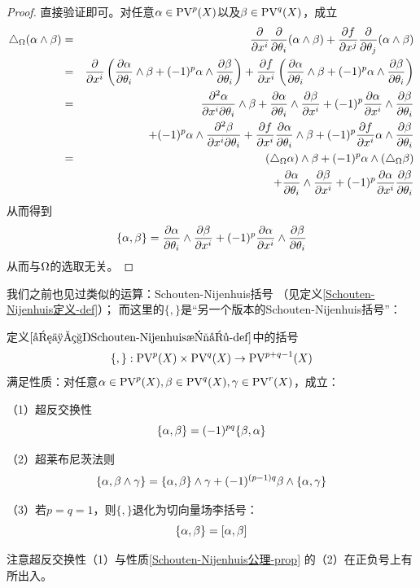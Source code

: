 \begin{proof}
直接验证即可。对任意$\alpha\in\operatorname{PV}^p(X)$以及$\beta\in\operatorname{PV}^q(X)$，成立
\begin{eqnarray*}
     \triangle_\Omega(\alpha\wedge\beta)
&=&
     \frac{\partial } {\partial x^i}\frac{\partial } {\partial \theta_i}
     (\alpha\wedge\beta)
    +\frac{\partial f} {\partial x^j}\frac{\partial } {\partial \theta_j}
     (\alpha\wedge\beta)\\
&=&
     \frac{\partial } {\partial x^i}
     \left(
       \frac{\partial \alpha} {\partial \theta_i}
       \wedge\beta
      +(-1)^p\alpha\wedge\frac{\partial \beta} {\partial \theta_i}
     \right)
    +\frac{\partial f} {\partial x^i}
     \left(
       \frac{\partial \alpha} {\partial \theta_i}\wedge\beta
      +(-1)^p\alpha\wedge\frac{\partial \beta} {\partial \theta_i}
     \right)\\
&=&
     \frac{\partial^2{\alpha}} {\partial{x^i}\partial{\theta_i}}\wedge\beta
    +\frac{\partial \alpha} {\partial \theta_i}\wedge\frac{\partial \beta} {\partial x^i}
    +(-1)^p\frac{\partial \alpha} {\partial x^i}\wedge\frac{\partial \beta} {\partial \theta_i}\\
& &
    +(-1)^p\alpha\wedge\frac{\partial^2{\beta}} {\partial{x^i}\partial{\theta_i}}
    +\frac{\partial f} {\partial x^i}\frac{\partial \alpha} {\partial \theta_i}\wedge\beta
    +(-1)^p\frac{\partial f} {\partial x^i}\alpha\wedge\frac{\partial \beta} {\partial \theta_i}\\
&=&
     (\triangle_\Omega\alpha)\wedge\beta
    +(-1)^p\alpha\wedge(\triangle_\Omega\beta)\\
& &
    +\frac{\partial \alpha} {\partial \theta_i}\wedge\frac{\partial \beta} {\partial x^i}
    +(-1)^p\frac{\partial \alpha} {\partial x^i}\frac{\partial \beta} {\partial \theta_i}
\end{eqnarray*}
从而得到
$$
  \{\alpha,\beta\}
=
  \frac{\partial \alpha} {\partial \theta_i}\wedge\frac{\partial \beta} {\partial x^i}
 +(-1)^p\frac{\partial \alpha} {\partial x^i}\wedge\frac{\partial \beta} {\partial \theta_i}
$$
从而与$\Omega$的选取无关。
\end{proof}

我们之前也见过类似的运算：Schouten-Nijenhuis括号
（见定义\ref{Schouten-Nijenhuis定义-def}）；
而这里的$\{,\}$是“另一个版本的Schouten-Nijenhuis括号”：

\begin{lemma}定义$\ref{另一种Schouten-Nijenhuis括号-def}$中的括号
$$\{,\}:\operatorname{PV}^p(X)\times\operatorname{PV}^q(X)\to\operatorname{PV}^{p+q-1}(X)$$
满足性质：对任意$\alpha\in\operatorname{PV}^p(X),\beta\in\operatorname{PV}^q(X),\gamma\in\operatorname{PV}^r(X)$，成立：

（1）超反交换性
$$\{\alpha,\beta\}=(-1)^{pq}\{\beta,\alpha\}$$

（2）超莱布尼茨法则
$$\{\alpha,\beta\wedge\gamma\}
=\{\alpha,\beta\}\wedge\gamma
+(-1)^{(p-1)q}\beta\wedge\{\alpha,\gamma\}$$

（3）若$p=q=1$，则$\{,\}$退化为切向量场李括号：
$$\{\alpha,\beta\}=[\alpha,\beta]$$
\end{lemma}

注意超反交换性（1）与性质\ref{Schouten-Nijenhuis公理-prop}
的（2）在正负号上有所出入。

